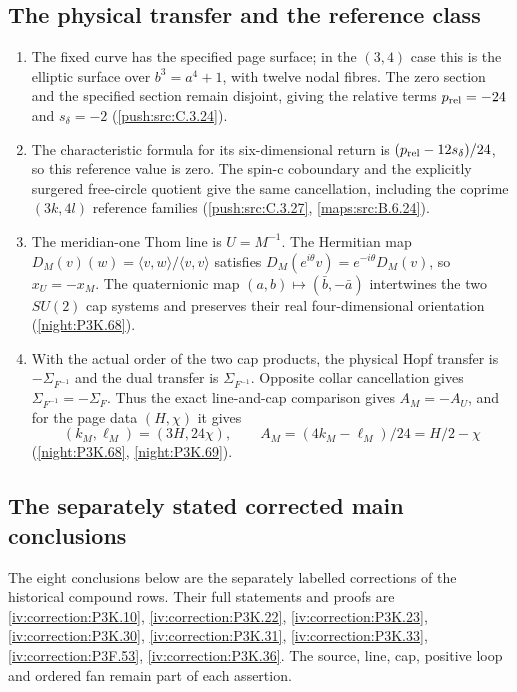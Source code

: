 \subsection{The physical transfer and the reference class}
\RungOne
\begin{enumerate}[label=\arabic*.]
\item The fixed curve has the specified page surface; in the
  $(3,4)$ case this is the elliptic surface over
  $b^3=a^4+1$, with twelve nodal fibres.  The zero section and the
  specified section remain disjoint, giving the relative terms
  $p_{\rm rel}=-24$ and $s_\delta=-2$
  (\cref{push:src:C.3.24}).
\item The characteristic formula for its six-dimensional return
  is $(p_{\rm rel}-12s_\delta)/24$, so this reference value is zero.
  The spin-c coboundary and the explicitly surgered free-circle
  quotient give the same cancellation, including the coprime
  $(3k,4l)$ reference families
  (\cref{push:src:C.3.27}, \cref{maps:src:B.6.24}).
\item The meridian-one Thom line is $U=M^{-1}$.  The Hermitian
  map $D_M(v)(w)=\langle v,w\rangle/\langle v,v\rangle$ satisfies
  $D_M(e^{i\theta}v)=e^{-i\theta}D_M(v)$, so $x_U=-x_M$.
  The quaternionic map $(a,b)\mapsto(\bar b,-\bar a)$ intertwines
  the two $SU(2)$ cap systems and preserves their real
  four-dimensional orientation (\cref{night:P3K.68}).
\item With the actual order of the two cap products, the physical
  Hopf transfer is $-\Sigma_{F^{-1}}$ and the dual transfer is
  $\Sigma_{F^{-1}}$.  Opposite collar cancellation gives
  $\Sigma_{F^{-1}}=-\Sigma_F$.  Thus the exact line-and-cap
  comparison gives $A_M=-A_U$, and for the page data $(H,\chi)$
  it gives
  \[
  (k_M,\ell_M)=(3H,24\chi),\qquad
  A_M=(4k_M-\ell_M)/24=H/2-\chi
  \]
  (\cref{night:P3K.68}, \cref{night:P3K.69}).
\end{enumerate}

\subsection{The separately stated corrected main conclusions}
The eight conclusions below are the separately labelled corrections of
the historical compound rows. Their full statements and proofs are
\cref{iv:correction:P3K.10}, \cref{iv:correction:P3K.22}, \cref{iv:correction:P3K.23}, \cref{iv:correction:P3K.30}, \cref{iv:correction:P3K.31}, \cref{iv:correction:P3K.33}, \cref{iv:correction:P3F.53}, \cref{iv:correction:P3K.36}. The source, line, cap,
positive loop and ordered fan remain part of each assertion.

